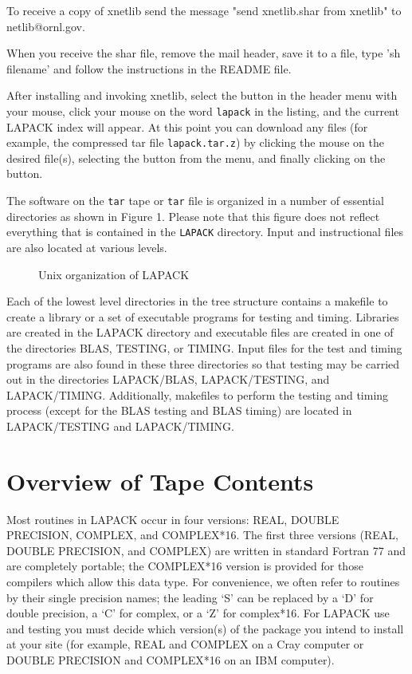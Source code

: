 To receive a copy of xnetlib send the message "send xnetlib.shar from
xnetlib" to netlib@ornl.gov.

When you receive the shar file, remove the mail header, save it to a
file, type 'sh filename' and follow the instructions in the README
file.

After installing and invoking xnetlib, select the  button
in the header menu with your mouse, click your mouse on the word {\tt lapack}
in the listing, and the current LAPACK index will appear.
At this point you can download any files (for example, the compressed tar
file {\tt lapack.tar.z}) by clicking the mouse on the desired file(s),
selecting the  button from the menu, and finally
clicking on the  button.

The software on the {\tt tar} tape or {\tt tar} file
is organized in a number of essential directories as shown
in Figure 1.  Please note that this figure does not reflect everything
that is contained in the {\tt LAPACK} directory.  Input and instructional
files are also located at various levels.
\begin{figure}
\vspace{11pt}
\centerline{}
\caption{Unix organization of LAPACK}
\vspace{11pt}
\end{figure}
Each of the lowest level directories in the tree structure contains a
makefile to create a library or a set of executable programs for testing
and timing.  Libraries are created in the LAPACK directory and 
executable files are created in one of the directories BLAS, TESTING,
or TIMING.  Input files for the test and timing programs are also
found in these three directories so that testing may be carried out
in the directories LAPACK/BLAS, LAPACK/TESTING, and LAPACK/TIMING.
Additionally, makefiles to perform the testing and timing process
(except for the BLAS testing and BLAS timing) are
located in LAPACK/TESTING and LAPACK/TIMING.


\section{Overview of Tape Contents}

\dent
Most routines in LAPACK occur in four versions: REAL,
DOUBLE PRECISION, COMPLEX, and COMPLEX*16.
The first three versions (REAL, DOUBLE PRECISION, and COMPLEX)
are written in standard Fortran 77 and are completely portable;
the COMPLEX*16 version is provided for
those compilers which allow this data type.  
For convenience, we often refer to routines by their single precision
names; the leading `S' can be replaced by a `D' for double precision,
a `C' for complex, or a `Z' for complex*16.  
For LAPACK use and testing you must decide which version(s)
of the package you intend to install at your site (for example,
REAL and COMPLEX on a Cray computer or DOUBLE PRECISION and
COMPLEX*16 on an IBM computer).

